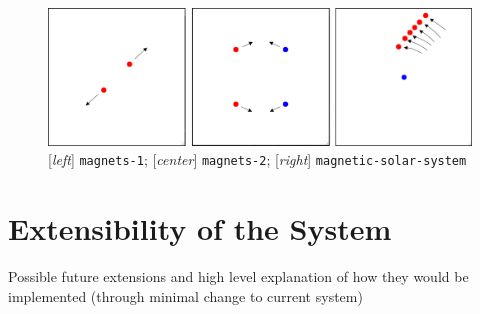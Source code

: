 \documentclass{article}
\begin{document}
\begin{figure}[h!]
  \centering
 \includegraphics[width=\textwidth,height=\textheight,keepaspectratio]{figs/magnetism.png}
  \caption{[\textit{left}] \texttt{magnets-1}; [\textit{center}] \texttt{magnets-2}; [\textit{right}] \texttt{magnetic-solar-system}}
  \label{figure:electromagnetism}
\end{figure}


\section{Extensibility of the System}

Possible future extensions and high level explanation of how they would be
implemented (through minimal change to current system)
\end{document}
